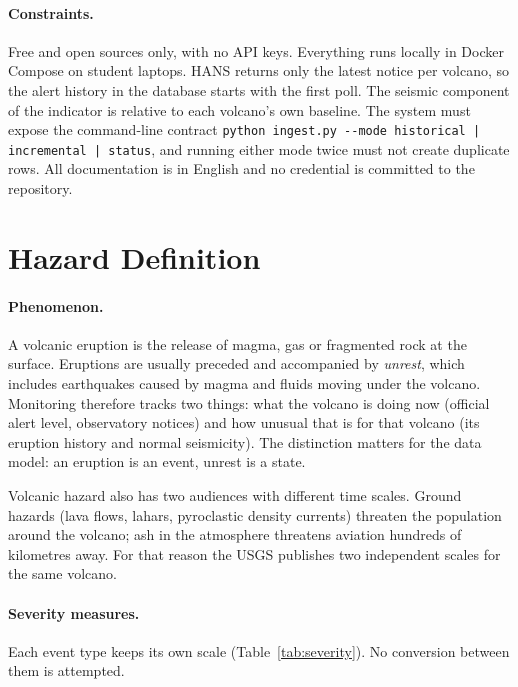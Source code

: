 \documentclass[11pt,a4paper]{article}
\begin{document}
\paragraph{Constraints.}
Free and open sources only, with no API keys. Everything runs locally in Docker
Compose on student laptops. HANS returns only the latest notice per volcano, so the
alert history in the database starts with the first poll. The seismic component of the
indicator is relative to each volcano's own baseline. The system must expose the
command-line contract
\texttt{python ingest.py -{}-mode historical | incremental | status}, and running
either mode twice must not create duplicate rows. All documentation is in English and
no credential is committed to the repository.

\section{Hazard Definition}
\label{sec:hazard}

\paragraph{Phenomenon.}
A volcanic eruption is the release of magma, gas or fragmented rock at the surface.
Eruptions are usually preceded and accompanied by \emph{unrest}, which includes
earthquakes caused by magma and fluids moving under the volcano. Monitoring therefore
tracks two things: what the volcano is doing now (official alert level, observatory
notices) and how unusual that is for that volcano (its eruption history and normal
seismicity). The distinction matters for the data model: an eruption is an event,
unrest is a state.

Volcanic hazard also has two audiences with different time scales. Ground hazards
(lava flows, lahars, pyroclastic density currents) threaten the population around the
volcano; ash in the atmosphere threatens aviation hundreds of kilometres away. For
that reason the USGS publishes two independent scales for the same volcano.

\paragraph{Severity measures.}
Each event type keeps its own scale (Table~\ref{tab:severity}). No conversion between
them is attempted.
\end{document}
